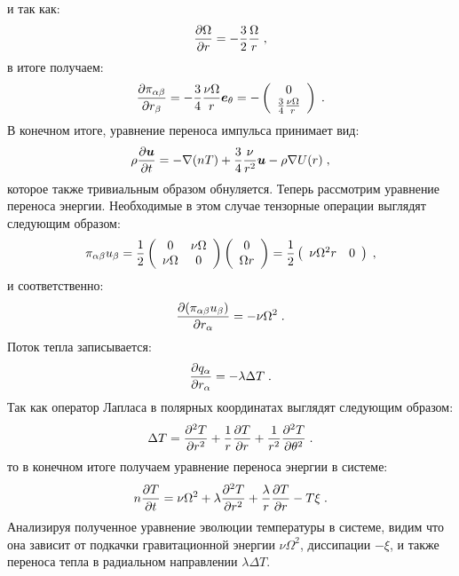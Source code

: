 и так как:
\begin{equation}
    \frac{\partial\Omega}{\partial r}=-\frac{3}{2}\frac{\Omega}{r}\;,
\end{equation}
в итоге получаем:
\begin{equation}
    \frac{\partial\pi_{\alpha\beta}}{\partial r_{\beta}}=-\frac{3}{4}\frac{\nu\Omega}{r}\bm{e}_{\theta}=-\left(\begin{array}{c}
        0 \\ \frac{3}{4}\frac{\nu\Omega}{r}
    \end{array}\right)\;.
\end{equation}
В конечном итоге, уравнение переноса импульса принимает вид:
\begin{equation}
    \rho\frac{\partial\bm{u}}{\partial t} = -\nabla(nT)+\frac{3}{4}\frac{\nu}{r^2}\bm{u}-\rho\nabla U(r)\;,
\end{equation} 
которое также тривиальным образом обнуляется.
Теперь рассмотрим уравнение переноса энергии. Необходимые в этом случае тензорные операции выглядят следующим образом:
\begin{equation}
    \pi_{\alpha\beta}u_{\beta} = \frac{1}{2}\left(\begin{array}{cc}
        0 & \nu\Omega \\
        \nu\Omega & 0
    \end{array}\right)\left(\begin{array}{c}
        0 \\ \Omega r        
    \end{array}\right) = \frac{1}{2}\left(\begin{array}{cc}
        \nu\Omega^2 r & 0        
    \end{array}\right)\;,
\end{equation}
и соответственно:
\begin{equation}
    \frac{\partial(\pi_{\alpha\beta}u_{\beta})}{\partial r_{\alpha}} = -\nu\Omega^2\;.
\end{equation}
Поток тепла записывается:
\begin{equation}
    \frac{\partial q_{\alpha}}{\partial r_{\alpha}} = -\lambda\Delta T\;.
\end{equation}
Так как оператор Лапласа в полярных координатах выглядят следующим образом:
\begin{equation}
    \Delta T = \frac{\partial^2 T}{\partial r^2}+\frac{1}{r}\frac{\partial T}{\partial r}+\frac{1}{r^2}\frac{\partial^2 T}{\partial\theta^2}\;.
\end{equation}
то в конечном итоге получаем уравнение переноса энергии в системе:
\begin{equation}\label{eq:temperature_evolution}
    n\frac{\partial T}{\partial t} = \nu\Omega^2 + \lambda\frac{\partial^2T}{\partial r^2} + \frac{\lambda}{r}\frac{\partial T}{\partial r} - T\xi\;.
\end{equation}
Анализируя полученное уравнение эволюции температуры в системе, видим что она зависит от подкачки
гравитационной энергии $\nu\Omega^2$, диссипации $-\xi$, и также переноса тепла в радиальном направлении $\lambda\Delta T$.

